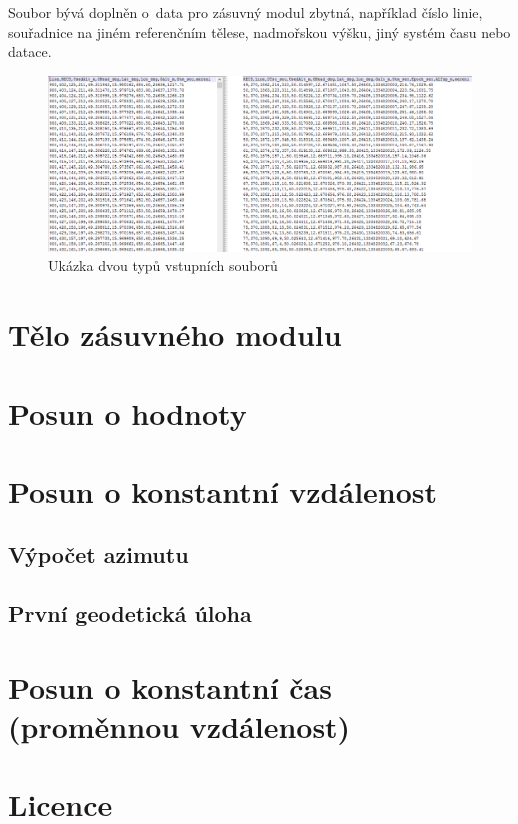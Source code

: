 Soubor bývá doplněn o~data pro zásuvný modul zbytná, například číslo linie, souřadnice na jiném
referenčním tělese, nadmořskou výšku, jiný systém času nebo datace. 

  \begin{figure}[H]
   \centering
	\includegraphics[scale=0.5]{./pictures/ukazka-vstup.png}
	\caption[Ukázka dvou typů vstupních souborů]{Ukázka dvou typů vstupních souborů
      \label{fig:ukazka-vstup}}
  \end{figure}

\section{Tělo zásuvného modulu}
\label{telo}

\section{Posun o hodnoty}
\label{by_points}

\section{Posun o konstantní vzdálenost}
\label{by_distance}

\subsection{Výpočet azimutu}
\label{azimut}

\subsection{První geodetická úloha}
\label{prvniguplugin}

\section{Posun o konstantní čas (proměnnou vzdálenost)}
\label{by_seconds}

\section{Licence}
\label{licence}



